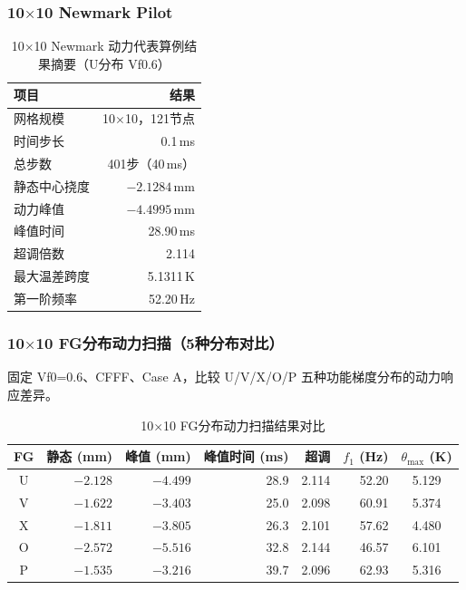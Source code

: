 \documentclass[12pt,a4paper]{ctexart}
\begin{document}
\subsubsection{10$\times$10 Newmark Pilot}

\begin{table}[H]
\centering
\caption{10$\times$10 Newmark 动力代表算例结果摘要（U分布 Vf0.6）}
\label{tab:dynamic-10x10}
\begin{tabular}{lr}
\toprule
\textbf{项目} & \textbf{结果} \\
\midrule
网格规模 & 10$\times$10，121节点 \\
时间步长 & 0.1\,ms \\
总步数 & 401步（40\,ms） \\
静态中心挠度 & $-2.1284$\,mm \\
动力峰值 & $-4.4995$\,mm \\
峰值时间 & 28.90\,ms \\
超调倍数 & 2.114 \\
最大温差跨度 & 5.1311\,K \\
第一阶频率 & 52.20\,Hz \\
\bottomrule
\end{tabular}
\end{table}

\subsubsection{10$\times$10 FG分布动力扫描（5种分布对比）}

固定 Vf0=0.6、CFFF、Case A，比较 U/V/X/O/P 五种功能梯度分布的动力响应差异。

\begin{table}[H]
\centering
\caption{10$\times$10 FG分布动力扫描结果对比}
\label{tab:dynamic-fg-sweep}
\small
\begin{tabular}{crrrrrc}
\toprule
\textbf{FG} & \textbf{静态} (mm) & \textbf{峰值} (mm) & \textbf{峰值时间} (ms) & \textbf{超调} & $f_1$ \textbf{(Hz)} & $\theta_{\max}$ \textbf{(K)} \\
\midrule
U & $-2.128$ & $-4.499$ & 28.9 & 2.114 & 52.20 & 5.129 \\
V & $-1.622$ & $-3.403$ & 25.0 & 2.098 & 60.91 & 5.374 \\
X & $-1.811$ & $-3.805$ & 26.3 & 2.101 & 57.62 & 4.480 \\
O & $-2.572$ & $-5.516$ & 32.8 & 2.144 & 46.57 & 6.101 \\
P & $-1.535$ & $-3.216$ & 39.7 & 2.096 & 62.93 & 5.316 \\
\bottomrule
\end{tabular}
\end{table}
\end{document}
